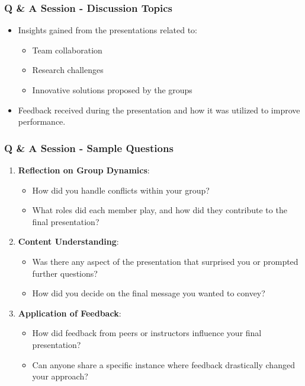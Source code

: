 \documentclass[aspectratio=169]{beamer}
\begin{document}
\begin{frame}[fragile]
    \frametitle{Q \& A Session - Discussion Topics}
    \begin{itemize}
        \item Insights gained from the presentations related to:
        \begin{itemize}
            \item Team collaboration
            \item Research challenges
            \item Innovative solutions proposed by the groups
        \end{itemize}
        \item Feedback received during the presentation and how it was utilized to improve performance.
    \end{itemize}
\end{frame}

\begin{frame}[fragile]
    \frametitle{Q \& A Session - Sample Questions}
    \begin{enumerate}
        \item \textbf{Reflection on Group Dynamics}:
        \begin{itemize}
            \item How did you handle conflicts within your group?
            \item What roles did each member play, and how did they contribute to the final presentation?
        \end{itemize}
        
        \item \textbf{Content Understanding}:
        \begin{itemize}
            \item Was there any aspect of the presentation that surprised you or prompted further questions?
            \item How did you decide on the final message you wanted to convey?
        \end{itemize}

        \item \textbf{Application of Feedback}:
        \begin{itemize}
            \item How did feedback from peers or instructors influence your final presentation?
            \item Can anyone share a specific instance where feedback drastically changed your approach?
        \end{itemize}
    \end{enumerate}
\end{frame}
\end{document}
